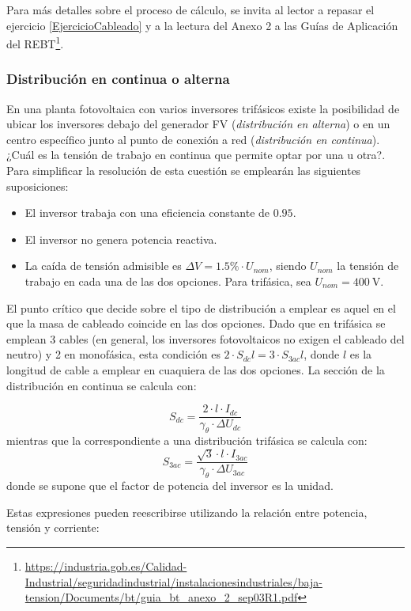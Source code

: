 Para más detalles sobre el proceso de cálculo, se invita al lector a
repasar el ejercicio \ref{EjercicioCableado} y a la lectura del Anexo
2 a las Guías de Aplicación del
REBT\footnote{\url{https://industria.gob.es/Calidad-Industrial/seguridadindustrial/instalacionesindustriales/baja-tension/Documents/bt/guia_bt_anexo_2_sep03R1.pdf}}.

\subsubsection{Distribución en continua o alterna}
\label{sec:cableado-dc-ac}

En una planta fotovoltaica con varios inversores trifásicos existe la
posibilidad de ubicar los inversores debajo del generador FV
(\emph{distribución en alterna}) o en un centro específico junto al
punto de conexión a red (\emph{distribución en continua}). ¿Cuál es la
tensión de trabajo en continua que permite optar por una u otra?. Para
simplificar la resolución de esta cuestión se emplearán las siguientes
suposiciones:
\begin{itemize}
\item El inversor trabaja con una eficiencia constante de $0.95$.
\item El inversor no genera potencia reactiva.
\item La caída de tensión admisible es $\Delta V=1.5\%\cdot U_{nom}$, siendo
$U_{nom}$ la tensión de trabajo en cada una de las dos opciones.
Para trifásica, sea $U_{nom}=\SI{400}{\volt}$.
\end{itemize}

El punto crítico que decide sobre el tipo de distribución a emplear
es aquel en el que la masa de cableado coincide en las dos opciones.
Dado que en trifásica se emplean 3 cables (en general, los inversores
fotovoltaicos no exigen el cableado del neutro) y 2 en monofásica,
esta condición es $2\cdot S_{dc}l=3\cdot S_{3ac}l$, donde $l$ es
la longitud de cable a emplear en cuaquiera de las dos opciones. La
sección de la distribución en continua se calcula con:

\[
  S_{dc}=\frac{2\cdot l\cdot I_{dc}}{\gamma_\theta\cdot\Delta U_{dc}}
\]
mientras que la correspondiente a una distribución trifásica se calcula
con:
\[
  S_{3ac}=\frac{\sqrt{3}\cdot l\cdot I_{3ac}}{\gamma_\theta\cdot\Delta U_{3ac}}
\]
donde se supone que el factor de potencia del inversor es la unidad.

Estas expresiones pueden reescribirse utilizando la relación entre
potencia, tensión y corriente:

